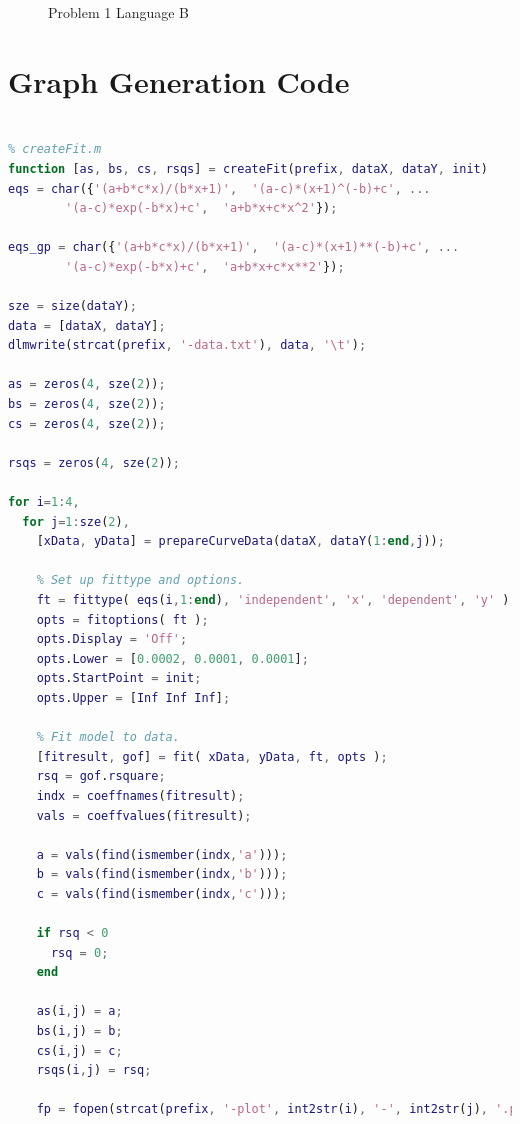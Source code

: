 \documentclass[a4paper,10pt]{article}
\begin{document}
\begin{appendices}
  \begin{figure}[!htb]
  \centering
  
  \caption{Problem 1 Language B}
  \end{figure}
  
  \clearpage
  \section{Graph Generation Code}
  \label{sec:graphgencode}
  \begin{lstlisting}[language=Matlab]
% Written for Matlab. Outputs GnuPlot files which produce LaTeX figures.

% createFit.m
function [as, bs, cs, rsqs] = createFit(prefix, dataX, dataY, init)
eqs = char({'(a+b*c*x)/(b*x+1)',  '(a-c)*(x+1)^(-b)+c', ...
        '(a-c)*exp(-b*x)+c',  'a+b*x+c*x^2'});

eqs_gp = char({'(a+b*c*x)/(b*x+1)',  '(a-c)*(x+1)**(-b)+c', ...
        '(a-c)*exp(-b*x)+c',  'a+b*x+c*x**2'});

sze = size(dataY);
data = [dataX, dataY];
dlmwrite(strcat(prefix, '-data.txt'), data, '\t');
      
as = zeros(4, sze(2));
bs = zeros(4, sze(2));
cs = zeros(4, sze(2));

rsqs = zeros(4, sze(2));

for i=1:4,
  for j=1:sze(2),
    [xData, yData] = prepareCurveData(dataX, dataY(1:end,j));

    % Set up fittype and options.
    ft = fittype( eqs(i,1:end), 'independent', 'x', 'dependent', 'y' );
    opts = fitoptions( ft );
    opts.Display = 'Off';
    opts.Lower = [0.0002, 0.0001, 0.0001];
    opts.StartPoint = init;
    opts.Upper = [Inf Inf Inf];

    % Fit model to data.
    [fitresult, gof] = fit( xData, yData, ft, opts );
    rsq = gof.rsquare;
    indx = coeffnames(fitresult);
    vals = coeffvalues(fitresult);
    
    a = vals(find(ismember(indx,'a')));
    b = vals(find(ismember(indx,'b')));
    c = vals(find(ismember(indx,'c')));
    
    if rsq < 0
      rsq = 0;
    end
    
    as(i,j) = a;
    bs(i,j) = b;
    cs(i,j) = c;
    rsqs(i,j) = rsq;

    fp = fopen(strcat(prefix, '-plot', int2str(i), '-', int2str(j), '.p'), 'w');
    

\end{lstlisting}
\end{appendices}
\end{document}
